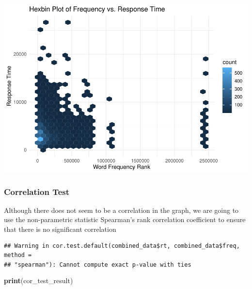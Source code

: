 \documentclass[
]{article}
\newenvironment{Shaded}{\begin{snugshade}}{\end{snugshade}}
\newcommand{\AttributeTok}[1]{\textcolor[rgb]{0.13,0.29,0.53}{#1}}
\newcommand{\FunctionTok}[1]{\textcolor[rgb]{0.13,0.29,0.53}{\textbf{#1}}}
\newcommand{\NormalTok}[1]{#1}
\newcommand{\OtherTok}[1]{\textcolor[rgb]{0.56,0.35,0.01}{#1}}
\newcommand{\SpecialCharTok}[1]{\textcolor[rgb]{0.81,0.36,0.00}{\textbf{#1}}}
\newcommand{\StringTok}[1]{\textcolor[rgb]{0.31,0.60,0.02}{#1}}
\begin{document}
\includegraphics{EDA_DavidMC_files/figure-latex/unnamed-chunk-20-1.pdf}

\hypertarget{correlation-test}{%
\subsubsection{Correlation Test}\label{correlation-test}}

Although there does not seem to be a correlation in the graph, we are
going to use the non-parametric statistic Spearman's rank correlation
coefficient to ensure that there is no significant correlation

\begin{Shaded}
\end{Shaded}

\begin{verbatim}
## Warning in cor.test.default(combined_data$rt, combined_data$freq, method =
## "spearman"): Cannot compute exact p-value with ties
\end{verbatim}

\begin{Shaded}
\begin{Highlighting}[]
\FunctionTok{print}\NormalTok{(cor\_test\_result)}
\end{Highlighting}
\end{Shaded}
\end{document}
